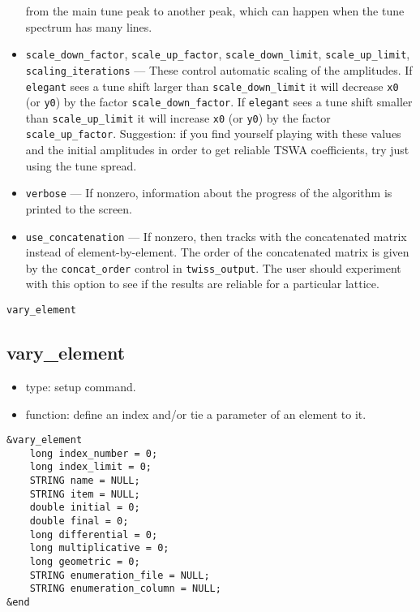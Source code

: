 \documentclass[11pt]{article}
\begin{document}
\begin{itemize}
        from the main tune peak to another peak, which can happen when the tune spectrum
        has many lines.
\item \verb|scale_down_factor|, \verb|scale_up_factor|, \verb|scale_down_limit|, 
        \verb|scale_up_limit|, \verb|scaling_iterations| --- These control automatic scaling
        of the amplitudes.  If {\tt elegant} sees a tune shift larger than \verb|scale_down_limit|
        it will decrease \verb|x0| (or \verb|y0|) by the factor \verb|scale_down_factor|. 
        If  {\tt elegant} sees a tune shift smaller than \verb|scale_up_limit|
        it will increase \verb|x0| (or \verb|y0|) by the factor \verb|scale_up_factor|. 
        Suggestion: if you find yourself playing with these values and the initial amplitudes
        in order to get reliable TSWA coefficients, try just using the tune spread.
\item \verb|verbose| --- If nonzero, information about the progress of the algorithm is 
        printed to the screen.
\item \verb|use_concatenation| --- If nonzero, then tracks with the concatenated matrix instead
        of element-by-element.  The order
        of the concatenated matrix is given by the \verb|concat_order| control in
        \verb|twiss_output|. The user should experiment with this option to see if the
        results are reliable for a particular lattice.
\end{itemize}

\begin{latexonly}
\newpage
\begin{center}{\Large\verb|vary_element|}\end{center}
\end{latexonly}
\subsection{vary\_element \label{subsec:varyelement}}

\begin{itemize}
\item type: setup command.
\item function: define an index and/or tie a parameter of an element to it.
\end{itemize}

\begin{verbatim}
&vary_element
    long index_number = 0;
    long index_limit = 0;
    STRING name = NULL;
    STRING item = NULL;
    double initial = 0;
    double final = 0;
    long differential = 0;
    long multiplicative = 0;
    long geometric = 0;
    STRING enumeration_file = NULL;
    STRING enumeration_column = NULL;
&end
\end{verbatim}
\end{document}
